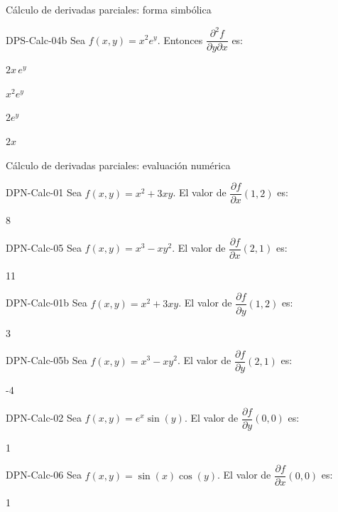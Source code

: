 \documentclass[a4,11pt]{aleph-notas}
\begin{document}
\begin{quiz}{Cálculo de derivadas parciales: forma simbólica}
\begin{multi}[]%
    {DPS-Calc-04b}
    Sea $f(x,y) = x^2 e^y$. Entonces $\dfrac{\partial^2 f}{\partial y \partial x}$ es:
    \item* $2x\,e^y$
    \item $x^2 e^y$
    \item $2e^y$
    \item $2x$
\end{multi}

\end{quiz}


\begin{quiz}{Cálculo de derivadas parciales: evaluación numérica}

\begin{numerical}[tolerance=0.01]%
    {DPN-Calc-01}
    Sea $f(x,y) = x^2 + 3xy$. El valor de $\dfrac{\partial f}{\partial x}(1,2)$ es:
    \item 8
\end{numerical}

\begin{numerical}[tolerance=0.01]%
    {DPN-Calc-05}
    Sea $f(x,y) = x^3 - xy^2$. El valor de $\dfrac{\partial f}{\partial x}(2,1)$ es:
    \item 11
\end{numerical}

\begin{numerical}[tolerance=0.01]%
    {DPN-Calc-01b}
    Sea $f(x,y) = x^2 + 3xy$. El valor de $\dfrac{\partial f}{\partial y}(1,2)$ es:
    \item 3
\end{numerical}

\begin{numerical}[tolerance=0.01]%
    {DPN-Calc-05b}
    Sea $f(x,y) = x^3 - xy^2$. El valor de $\dfrac{\partial f}{\partial y}(2,1)$ es:
    \item -4
\end{numerical}

\begin{numerical}[tolerance=0.01]%
    {DPN-Calc-02}
    Sea $f(x,y) = e^x \sin(y)$. El valor de $\dfrac{\partial f}{\partial y}(0,0)$ es:
    \item 1
\end{numerical}

\begin{numerical}[tolerance=0.01]%
    {DPN-Calc-06}
    Sea $f(x,y) = \sin(x)\cos(y)$. El valor de $\dfrac{\partial f}{\partial x}(0,0)$ es:
    \item 1
\end{numerical}


\end{quiz}
\end{document}
